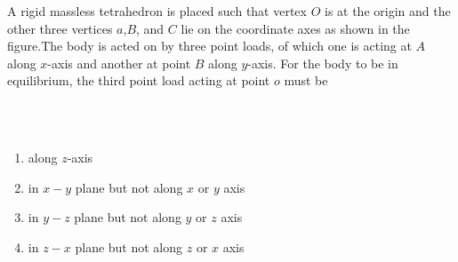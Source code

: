 

\iffalse
    \title{Assignment}
    \author{EE24BTECH11028}
    \section{me}
    \chapter{2024}
  \fi
\item A rigid massless tetrahedron is placed such that vertex $O$ is at the origin and the other three vertices $a$,$B$, and $C$ lie on the coordinate axes as shown in the figure.The body is acted on by three point loads, of which one is acting at $A$ along $x$-axis and another at point $B$ along $y$-axis. For the body to be in equilibrium, the third point load acting at point $o$ must be\\\\
\\
\begin{enumerate}
    \item along $z$-axis\\
    \item in $x-y$ plane but not along $x$ or $y$ axis\\
    \item in $y-z$ plane but not along $y$ or $z$ axis\\
    \item in $z-x$ plane but not along $z$ or $x$ axis
\end{enumerate}
